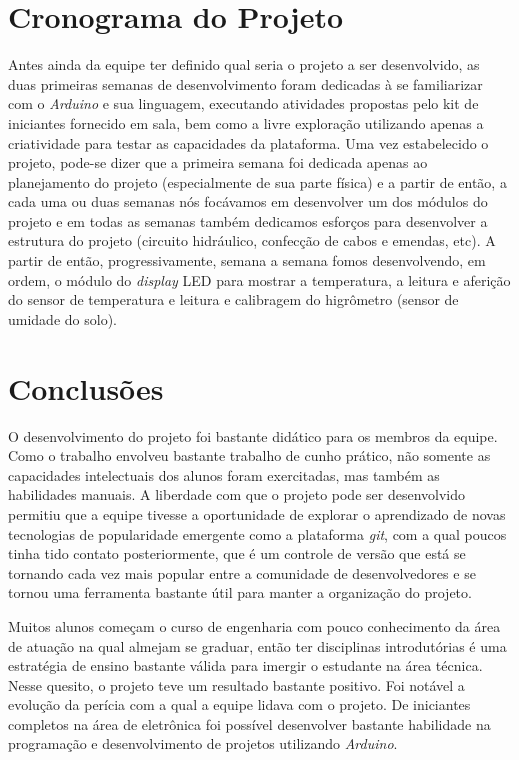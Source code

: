 \documentclass[a4paper,12pt]{article}
\begin{document}
\section{Cronograma do Projeto}
Antes ainda da equipe ter definido qual seria o projeto a ser desenvolvido, as duas primeiras semanas de desenvolvimento foram dedicadas à se familiarizar com o \textit{Arduino} e sua linguagem, executando atividades propostas pelo kit de iniciantes fornecido em sala, bem como a livre exploração utilizando apenas a criatividade para testar as capacidades da plataforma. Uma vez estabelecido o projeto, pode-se dizer que a primeira semana foi dedicada apenas ao planejamento do projeto (especialmente de sua parte física) e a partir de então, a cada uma ou duas semanas nós focávamos em desenvolver um dos módulos do projeto e em todas as semanas também dedicamos esforços para desenvolver a estrutura do projeto (circuito hidráulico, confecção de cabos e emendas, etc). A partir de então, progressivamente, semana a semana fomos desenvolvendo, em ordem, o módulo do \textit{display} LED para mostrar a temperatura, a leitura e aferição do sensor de temperatura e leitura e calibragem do higrômetro (sensor de umidade do solo).

\newpage
\section{Conclusões}
O desenvolvimento do projeto foi bastante didático para os membros da equipe. Como o trabalho envolveu bastante trabalho de cunho prático, não somente as capacidades intelectuais dos alunos foram exercitadas, mas também as habilidades manuais. A liberdade com que o projeto pode ser desenvolvido permitiu que a equipe tivesse a oportunidade de explorar o aprendizado de novas tecnologias de popularidade emergente como a plataforma \textit{git}, com a qual poucos tinha tido contato posteriormente, que é um controle de versão que está se tornando cada vez mais popular entre a comunidade de desenvolvedores e se tornou uma ferramenta bastante útil para manter a organização do projeto.

Muitos alunos começam o curso de engenharia com pouco conhecimento da área de atuação na qual almejam se graduar, então ter disciplinas introdutórias é uma estratégia de ensino bastante válida para imergir o estudante na área técnica. Nesse quesito, o projeto teve um resultado bastante positivo. Foi notável a evolução da perícia com a qual a equipe lidava com o projeto. De iniciantes completos na área de eletrônica foi possível desenvolver bastante habilidade na programação e desenvolvimento de projetos utilizando \textit{Arduino}.
\end{document}
